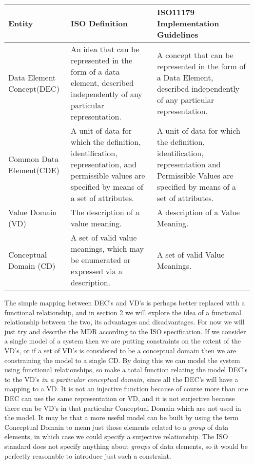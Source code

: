 \begin{table}[h]
	\begin{tabular}{ p{1.8cm} p{2.8cm}  p{3.0cm}  }  %
		\hline
		Entity & ISO Definition & ISO11179 Implementation Guidelines  \\ 
		\hline
		Data Element Concept(DEC) & An idea that can be represented in the form of a data element, described independently of any particular representation. & A concept that can be represented in the form of a Data Element, described independently of any particular representation.\\
		Common Data Element(CDE) & A unit of data for which the definition, identification, representation, and permissible values are specified by means of a set of attributes. & A unit of data for which the definition, identification, representation and Permissible Values are specified by means of a set of attributes. \\
		Value Domain (VD) & The description of a value meaning. & A description of a Value Meaning. \\
		Conceptual Domain (CD) & A set of valid value meanings, which may be enumerated or expressed via a description.& A set of valid Value Meanings.\\
		\hline
	\end{tabular}
\end{table}

\vspace{5.mm}


The simple mapping between DEC's and VD's is perhaps better replaced with a functional relationship, and in section 2 we will explore the idea of a functional relationship between the two, its advantages and disadvantages. For now we will just try and describe the MDR according to the ISO specification. If we consider a single model of a system then we are putting constraints on the extent of the VD's, or if a set of VD's is considered to be a conceptual domain then we are constraining the model to a single CD.  By doing this we can model the system using functional relationships, so make a total function relating the model DEC's to the VD's \emph{in a particular conceptual domain}, since all the DEC's will have a mapping to a VD. It is not an injective function because of course more than one DEC can use the same representation or VD, and it is not surjective because there can be VD's in that particular Conceptual Domain which are not used in the model. It may be that a more useful model can be built by using the term Conceptual Domain to mean just those elements related to a \emph{group} of data elements, in which case we could specify a surjective relationship.  The ISO standard does not specify anything about \emph{groups} of data elements, so it would be perfectly reasonable to introduce just such a constraint. 


